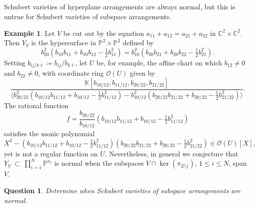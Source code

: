 \documentclass[11pt]{article}
\newtheorem{ques}[theo]{Question}
\theoremstyle{definition}
\newtheorem{exam}[theo]{Example}
\numberwithin{equation}{section}
\renewcommand{\P}{\mathbb{P}}
\newcommand{\C}{\mathbb{C}}
\newcommand{\K}{\mathbb{K}}
\begin{document}
\subsection{} Schubert varieties of hyperplane arrangements are always normal, but this is untrue for Schubert varieties of subspace arrangements.
\begin{exam}\label{zb:nonnormal}
  Let $V$ be cut out by the equation $a_{11} + a_{12} = a_{21} + a_{22}$ in $\C^2 \times \C^2$.
  Then $Y_V$ is the hypersurface in $\P^2 \times \P^2$ defined by
  \[
    b_{20}^2( b_{10}b_{11} + b_{10}b_{12} - \tfrac{1}{2} b_{11}^2)
    = b_{10}^2 (b_{20} b_{21} + b_{20} b_{22} - \tfrac12 b_{21}^2).
  \]
  Setting $b_{ij/k\ell} \coloneqq b_{ij} / b_{k\ell}$, let $U$ be, for example, the affine chart on which $b_{12} \neq 0$ and $b_{22} \neq 0$, with coordinate ring $\mathcal O(U)$ given by
  \[
    \frac{\K[b_{10/12}, b_{11/12}, b_{20/22}, b_{21/22}]}
    {\langle b_{20/22}^2(b_{10/12} b_{11/12} + b_{10/12} - \tfrac12 b_{11/12}^2) - b_{10/12}^2(b_{20/22}b_{21/22} + b_{20/22} - \tfrac12 b_{21/22}^2) \rangle}.
  \]
  The rational function
  \[
    f = \frac{b_{20/22}}{b_{10/12}} ( b_{10/12}b_{11/12} + b_{10/12} - \tfrac{1}{2} b_{11/12}^2)
  \]
  satisfies the monic polynomial
  \[ X^2 - ( b_{10/12}b_{11/12} + b_{10/12} - \tfrac{1}{2} b_{11/12}^2)(b_{20/22} b_{21/22} + b_{20/22} - \tfrac12 b_{21/22}^2) \in \mathcal O(U)[X], \]
  yet is not a regular function on $U$. 
  Nevertheless, in general we conjecture that $Y_V~\subset~\prod_{i=1}^N \P^{n_i}$ is normal when the subspaces $V \cap \ker(\pi_{E \setminus i})$, $1 \leq i \leq N$, span $V$.
\end{exam}
\begin{ques}
  Determine when Schubert varieties of subspace arrangements are normal.
\end{ques}
\end{document}
